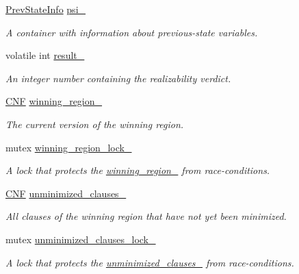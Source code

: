 \begin{DoxyCompactItemize}
\item 
\hyperlink{classPrevStateInfo}{Prev\-State\-Info} \hyperlink{classParallelLearner_ae5d7eda773fa4cc5412b24dac9c5b542}{psi\-\_\-}
\begin{DoxyCompactList}\small\item\em A container with information about previous-\/state variables. \end{DoxyCompactList}\item 
volatile int \hyperlink{classParallelLearner_aa44682a4999526a304b5118047df7a44}{result\-\_\-}
\begin{DoxyCompactList}\small\item\em An integer number containing the realizability verdict. \end{DoxyCompactList}\item 
\hyperlink{classCNF}{C\-N\-F} \hyperlink{classParallelLearner_a7c8383543ff98d7a0356a237756dcdd6}{winning\-\_\-region\-\_\-}
\begin{DoxyCompactList}\small\item\em The current version of the winning region. \end{DoxyCompactList}\item 
mutex \hyperlink{classParallelLearner_a196a4500dfd66a4b9110659b4a10dead}{winning\-\_\-region\-\_\-lock\-\_\-}
\begin{DoxyCompactList}\small\item\em A lock that protects the \hyperlink{classParallelLearner_a7c8383543ff98d7a0356a237756dcdd6}{winning\-\_\-region\-\_\-} from race-\/conditions. \end{DoxyCompactList}\item 
\hyperlink{classCNF}{C\-N\-F} \hyperlink{classParallelLearner_aba6b363071d9a39d7b368cec5b629c25}{unminimized\-\_\-clauses\-\_\-}
\begin{DoxyCompactList}\small\item\em All clauses of the winning region that have not yet been minimized. \end{DoxyCompactList}\item 
mutex \hyperlink{classParallelLearner_aa16d364d9fdd0c2fe5180ee1b023a4ec}{unminimized\-\_\-clauses\-\_\-lock\-\_\-}
\begin{DoxyCompactList}\small\item\em A lock that protects the \hyperlink{classParallelLearner_aba6b363071d9a39d7b368cec5b629c25}{unminimized\-\_\-clauses\-\_\-} from race-\/conditions. \end{DoxyCompactList}\item 

\end{DoxyCompactItemize}
